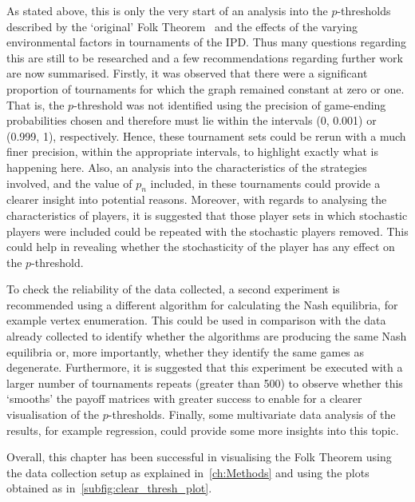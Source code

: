 As stated above, this is only the very start of an analysis into the
\(p\)-thresholds described by the `original' Folk Theorem~\cite{Friedman1971} and the effects of the
varying environmental factors in tournaments of the IPD. Thus many
questions regarding this are still to be researched and a few recommendations
regarding further work are now summarised. Firstly, it was observed that there were a
significant proportion of tournaments for which the graph remained constant at
zero or one. That is, the \(p\)-threshold was not identified using the precision of
game-ending probabilities chosen and therefore must lie within the intervals (0,
0.001) or (0.999, 1), respectively. Hence, these tournament sets could be rerun
with a much finer precision, within the appropriate intervals, to highlight
exactly what is happening here. Also, an analysis into the characteristics of
the strategies involved, and the value of \(p_{n}\) included, in these
tournaments could provide a clearer insight into potential reasons.
Moreover, with regards to analysing the characteristics of players, it is
suggested that those player sets in which stochastic players were included
could be repeated with the stochastic players removed. This could help in revealing whether
the stochasticity of the player has any effect on the \(p\)-threshold. 

To check the reliability of the data collected, a second
experiment is recommended using a different algorithm for calculating the Nash
equilibria, for example vertex enumeration. This could be used in comparison
with the data already collected to identify whether the algorithms are producing
the same Nash equilibria or, more importantly, whether they identify the same
games as degenerate. Furthermore, it is suggested that this experiment be
executed with a larger number of tournaments repeats (greater than 500) to
observe whether this `smooths' the payoff matrices with greater success to
enable for a clearer visualisation of the \(p\)-thresholds. Finally, some
multivariate data analysis of the results, for example regression, could provide
some more insights into this topic.

Overall, this chapter has been successful in visualising the Folk Theorem using
the data collection setup as explained in~\autoref{ch:Methods} and using the plots
obtained as in~\autoref{subfig:clear_thresh_plot}.
